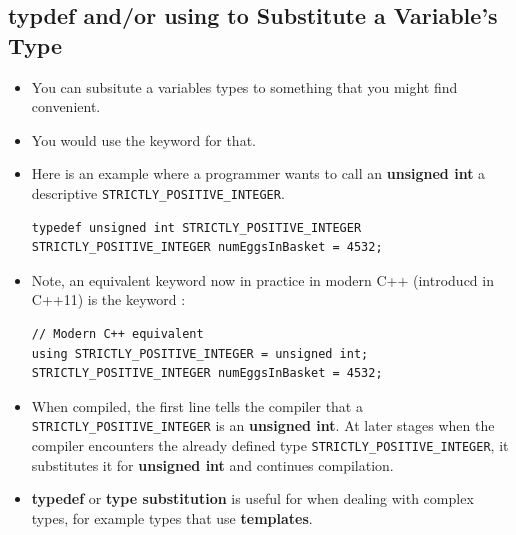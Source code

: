 \documentclass[10pt]{article}
\newcommand{\vocab}[1]{\fbox{\textbf{\textit{#1}}}}
\begin{document}
\newpage
\subsection{typdef and/or using to Substitute a Variable's Type}
\begin{itemize}
	\item You can subsitute a variables types to something that you might find convenient.

	\item You would use the keyword \vocab{typedef} for that.

	\item Here is an example where a programmer wants to call an \textbf{unsigned int} a descriptive \verb|STRICTLY_POSITIVE_INTEGER|.

		\begin{verbatim}
typedef unsigned int STRICTLY_POSITIVE_INTEGER
STRICTLY_POSITIVE_INTEGER numEggsInBasket = 4532;
		\end{verbatim}

	\item Note, an equivalent keyword now in practice in modern C++ (introducd in C++11) is the keyword \vocab{using}:

	\begin{verbatim}
// Modern C++ equivalent
using STRICTLY_POSITIVE_INTEGER = unsigned int;
STRICTLY_POSITIVE_INTEGER numEggsInBasket = 4532;
	\end{verbatim}

\item When compiled, the first line tells the compiler that a \verb|STRICTLY_POSITIVE_INTEGER| is an \textbf{unsigned int}. At later stages when the compiler encounters the already defined type \verb|STRICTLY_POSITIVE_INTEGER|, it substitutes it for \textbf{unsigned int} and continues compilation.

\item \textbf{typedef} or \textbf{type substitution} is useful for when dealing with complex types, for example types that use \textbf{templates}.
\end{itemize}

\newpage
\end{document}
